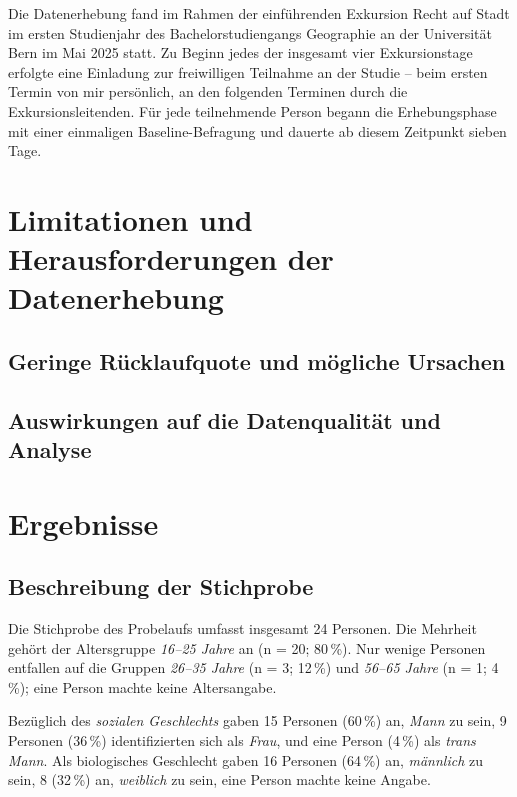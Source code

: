 Die Datenerhebung fand im Rahmen der einführenden Exkursion Recht auf Stadt im ersten Studienjahr des Bachelorstudiengangs Geographie an der Universität Bern im Mai 2025 statt. Zu Beginn jedes der insgesamt vier Exkursionstage erfolgte eine Einladung zur freiwilligen Teilnahme an der Studie -- beim ersten Termin von mir persönlich, an den folgenden Terminen durch die Exkursionsleitenden. Für jede teilnehmende Person begann die Erhebungsphase mit einer einmaligen Baseline-Befragung und dauerte ab diesem Zeitpunkt sieben Tage.


\section{Limitationen und Herausforderungen der Datenerhebung}

\subsection{Geringe Rücklaufquote und mögliche Ursachen}

\subsection{Auswirkungen auf die Datenqualität und Analyse}


\section{Ergebnisse} \label{sec:ergebnisse}

\subsection*{Beschreibung der Stichprobe}

Die Stichprobe des Probelaufs umfasst insgesamt 24 Personen. Die Mehrheit gehört der Altersgruppe \emph{16--25 Jahre} an (n = 20; 80\,\%). Nur wenige Personen entfallen auf die Gruppen \emph{26--35 Jahre} (n = 3; 12\,\%) und \emph{56--65 Jahre} (n = 1; 4\,\%); eine Person machte keine Altersangabe.

Bezüglich des \emph{sozialen Geschlechts} gaben 15 Personen (60\,\%) an, \emph{Mann} zu sein, 9 Personen (36\,\%) identifizierten sich als \emph{Frau}, und eine Person (4\,\%) als \emph{trans Mann}. Als biologisches Geschlecht gaben 16 Personen (64\,\%) an, \emph{männlich} zu sein, 8 (32\,\%) an, \emph{weiblich} zu sein, eine Person machte keine Angabe.

